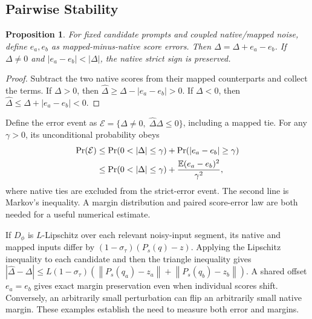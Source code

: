 \documentclass[10pt,twocolumn,letterpaper]{article}
\newtheorem{proposition}{Proposition}
\newcommand{\norm}[1]{\left\lVert#1\right\rVert}
\begin{document}
\subsection{Pairwise Stability}
\begin{proposition}
For fixed candidate prompts and coupled native/mapped noise, define $e_a,e_b$ as mapped-minus-native score errors. Then $\widehat\Delta=\Delta+e_a-e_b$. If $\Delta\ne0$ and $|e_a-e_b|<|\Delta|$, the native strict sign is preserved.
\end{proposition}
\begin{proof}
Subtract the two native scores from their mapped counterparts and collect the terms. If $\Delta>0$, then $\widehat\Delta\ge\Delta-|e_a-e_b|>0$. If $\Delta<0$, then $\widehat\Delta\le\Delta+|e_a-e_b|<0$.
\end{proof}
Define the error event as $\mathcal E=\{\Delta\ne0,\;\widehat\Delta\Delta\leq0\}$, including a mapped tie. For any $\gamma>0$, its unconditional probability obeys
\begin{align}
 \Pr(\mathcal E)
 &\leq\Pr(0<|\Delta|\leq\gamma)+\Pr(|e_a-e_b|\geq\gamma)\\
 &\leq\Pr(0<|\Delta|\leq\gamma)+\frac{\E(e_a-e_b)^2}{\gamma^2},
\end{align}
where native ties are excluded from the strict-error event. The second line is Markov's inequality. A margin distribution and paired score-error law are both needed for a useful numerical estimate.

If $D_\phi$ is $L$-Lipschitz over each relevant noisy-input segment, its native and mapped inputs differ by $(1-\sigma_\tau)(P_s(q)-z)$. Applying the Lipschitz inequality to each candidate and then the triangle inequality gives $|\widehat\Delta-\Delta|\le L(1-\sigma_\tau)(\norm{P_s(q_a)-z_a}+\norm{P_s(q_b)-z_b})$. A shared offset $e_a=e_b$ gives exact margin preservation even when individual scores shift. Conversely, an arbitrarily small perturbation can flip an arbitrarily small native margin. These examples establish the need to measure both error and margins.
\end{document}
